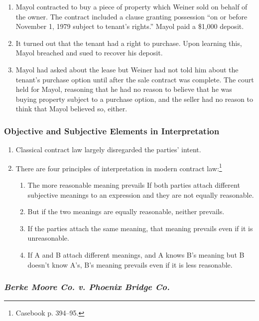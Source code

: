 \begin{enumerate}
    \item Mayol contracted to buy a piece of property which Weiner sold on 
    behalf of the owner. The contract included a clause granting possession 
    ``on or before November 1, 1979 subject to tenant's rights.'' Mayol paid a 
    \$1,000 deposit.
    \item It turned out that the tenant had a right to purchase. Upon learning 
    this, Mayol breached and sued to recover his deposit.
    \item Mayol had asked about the lease but Weiner had not told him about 
    the tenant's purchase option until after the sale contract was complete. 
    The court held for Mayol, reasoning that he had no reason to believe that 
    he was buying property subject to a purchase option, and the seller had no 
    reason to think that Mayol believed so, either.
\end{enumerate}

\subsubsection{Objective and Subjective Elements in Interpretation}

\begin{enumerate}
    \item Classical contract law largely disregarded the parties' intent.
    \item There are four principles of interpretation in modern contract 
    law:\footnote{Casebook p. 394--95.}
    \begin{enumerate}
        \item The more reasonable meaning prevails If both parties attach 
        different subjective meanings to an expression  and they 
        are not equally reasonable.
        \item But if the two meanings are equally reasonable, neither 
        prevails.
        \item If the parties attach the same meaning, that meaning prevails 
        even if it is unreasonable.
        \item If A and B attach different meanings, and A knows B's meaning 
        but B doesn't know A's, B's meaning prevails even if it is less 
        reasonable.
    \end{enumerate}
\end{enumerate}

\subsubsection{\emph{Berke Moore Co. v. Phoenix Bridge Co.}}

